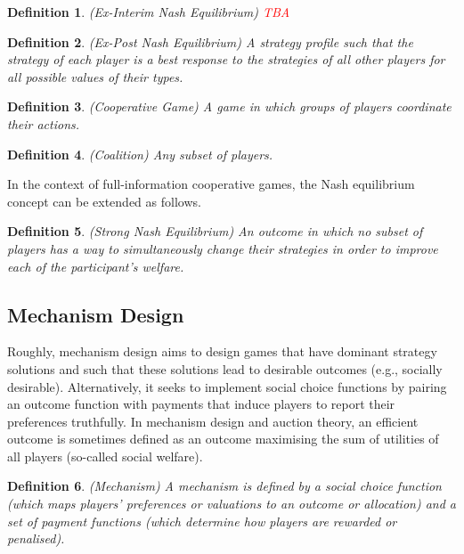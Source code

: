 \documentclass{article}
\newtheorem{definition}{Definition}
\begin{document}

\begin{definition}
(Ex-Interim Nash Equilibrium) \textcolor{red}{TBA}
\end{definition}

\begin{definition}
(Ex-Post Nash Equilibrium) A strategy profile such that the strategy of each player is a best response to the strategies of all other players for all possible values of their types.
\end{definition}

\begin{definition}
(Cooperative Game) A game in which groups of players coordinate their actions.
\end{definition}

\begin{definition}
(Coalition) Any subset of players.
\end{definition}

In the context of full-information cooperative games, the Nash equilibrium concept can be extended as follows.

\begin{definition}
(Strong Nash Equilibrium) An outcome in which no subset of players has a way to simultaneously change their strategies in order to improve each of the participant's welfare.
\end{definition}

\subsection{Mechanism Design}

Roughly, mechanism design aims to design games that have dominant strategy solutions and such that these solutions lead to desirable outcomes (e.g., socially desirable). Alternatively, it seeks to implement social choice functions by pairing an outcome function with payments that induce players to report their preferences truthfully. In mechanism design and auction theory, an efficient outcome is sometimes defined as an outcome maximising the sum of utilities of all players (so-called social welfare).

\begin{definition}
(Mechanism) A mechanism is defined by a social choice function (which maps players' preferences or valuations to an outcome or allocation) and a set of payment functions (which determine how players are rewarded or penalised).
\end{definition}
\end{document}
